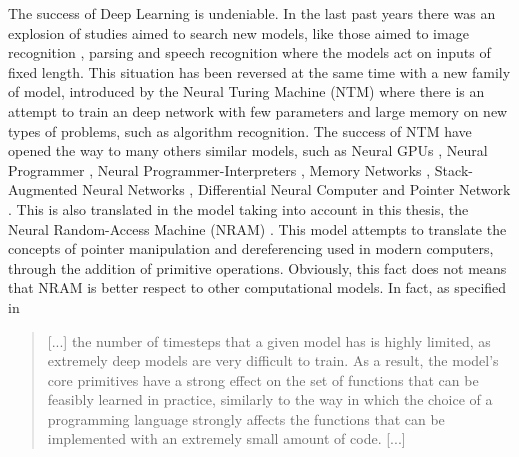 The success of Deep Learning is undeniable. In the last past years there was an explosion of studies aimed to search new models, like those aimed to image recognition \cite{Krizhevsky2012ImageNetCW}, parsing \cite{Vinyals2015GrammarAA} and speech recognition \cite{Chan2015ListenAA} where the models act on inputs of fixed length. This situation has been reversed at the same time with a new family of model, introduced by the Neural Turing Machine (NTM) \cite{Graves2014NeuralTM} where there is an attempt to train an deep network with few parameters and large memory on new types of problems, such as algorithm recognition. The success of NTM have opened the way to many others similar models, such as Neural GPUs \cite{Kaiser2015NeuralGL}, Neural Programmer \cite{Neelakantan2015NeuralPI}, Neural Programmer-Interpreters \cite{Reed2015NeuralP}, Memory Networks \cite{Weston2014MemoryN}, Stack-Augmented Neural Networks \cite{Joulin2015InferringAP}, Differential Neural Computer \cite{Graves2016HybridCU} and Pointer Network \cite{Vinyals2015PointerN}.
\newline \newline
This is also translated in the model taking into account in this thesis, the Neural Random-Access Machine (NRAM) \cite{NRAM:2016}. This model attempts to translate the concepts of pointer manipulation and dereferencing used in modern computers, through the addition of primitive operations. Obviously, this fact does not means that NRAM is better respect to other computational models. In fact, as specified in \cite{NRAM:2016}
\begin{quote}
[...] the number of timesteps that a given model has is highly limited, as extremely deep models are very difficult to train. As a result, the model’s core primitives have a strong effect on the set of functions that can be feasibly learned in practice, similarly to the way in which the choice of a programming language strongly affects the functions that can be implemented with an extremely small amount of code. [...]
\end{quote}

